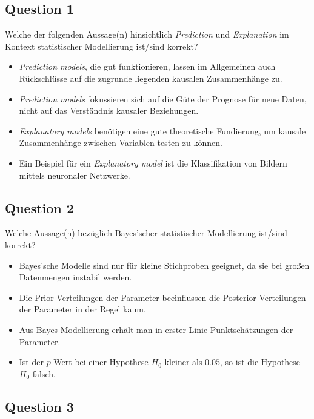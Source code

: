 \documentclass[
]{book}
\providecommand{\tightlist}{%
  \setlength{\itemsep}{0pt}\setlength{\parskip}{0pt}}
\begin{document}
\subsection{Question 1}\label{question-1}

Welche der folgenden Aussage(n) hinsichtlich \emph{Prediction} und \emph{Explanation} im
Kontext statistischer Modellierung ist/sind korrekt?

\begin{itemize}
\tightlist
\item
  \emph{Prediction models}, die gut funktionieren, lassen im Allgemeinen
  auch Rückschlüsse auf die zugrunde liegenden kausalen Zusammenhänge zu.
\item
  \emph{Prediction models} fokussieren sich auf die Güte der Prognose
  für neue Daten, nicht auf das Verständnis kausaler Beziehungen.
\item
  \emph{Explanatory models} benötigen eine gute theoretische
  Fundierung, um kausale Zusammenhänge zwischen Variablen testen zu können.
\item
  Ein Beispiel für ein \emph{Explanatory model} ist die Klassifikation von Bildern
  mittels neuronaler Netzwerke.
\end{itemize}

\subsection{Question 2}\label{question-2}

Welche Aussage(n) bezüglich Bayes'scher statistischer Modellierung ist/sind korrekt?

\begin{itemize}
\tightlist
\item
  Bayes'sche Modelle sind nur für kleine Stichproben geeignet,
  da sie bei großen Datenmengen instabil werden.
\item
  Die Prior-Verteilungen der Parameter beeinflussen die Posterior-Verteilungen
  der Parameter in der Regel kaum.
\item
  Aus Bayes Modellierung erhält man in erster Linie Punktschätzungen der Parameter.
\item
  Ist der \(p\)-Wert bei einer Hypothese \(H_0\) kleiner als \(0.05\),
  so ist die Hypothese \(H_0\) falsch.
\end{itemize}

\subsection{Question 3}\label{question-3}
\end{document}
